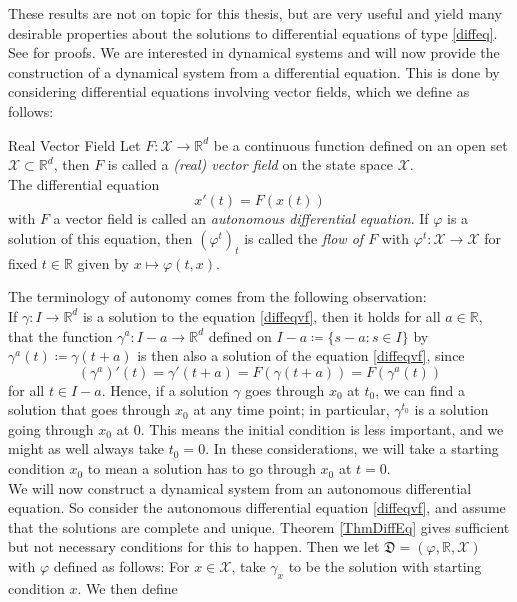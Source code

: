 \documentclass[11pt, a4paper]{memoir}
\theoremstyle{break}
\theoremstyle{break}
\theoremstyle{nonumberplain}
\newcommand{\mR}{\mathbb{R}}
\begin{document}
These results are not on topic for this thesis, but are very useful and yield many desirable properties about the solutions to differential equations of type \ref{diffeq}. See \cite{Dynamics} for proofs. We are interested in dynamical systems and will now provide the construction of a dynamical system from a differential equation. This is done by considering differential equations involving vector fields, which we define as follows:
\begin{mydefinition}{Real Vector Field}
Let $F:\mathcal{X}\to\mR^d$ be a continuous function defined on an open set $\mathcal{X}\subset \mR^d$, then $F$ is called a \emph{(real) vector field} on the state space $\mathcal{X}$.\\[5pt]
The differential equation
\begin{equation}\label{diffeqvf}
x'(t)=F(x(t))
\end{equation}
with $F$ a vector field is called an \emph{autonomous differential equation}. If $\varphi$ is a solution of this equation, then $(\varphi^t)_t$ is called the \emph{flow of $F$} with $\varphi^t: \mathcal{X}\to \mathcal{X}$ for fixed $t\in \mR$ given by $x\mapsto\varphi(t,x)$.
\end{mydefinition}
\noindent The terminology of autonomy comes from the following observation:\\
If $\gamma:I\to\mR^d$ is a solution to the equation \ref{diffeqvf}, then it holds for all $a\in\mR$, that the function $\gamma^a:I-a\to\mR^d$ defined on $I-a\coloneqq \{s-a: s\in I\}$ by $\gamma^a(t)\coloneqq \gamma(t+a)$ is then also a solution of the equation \ref{diffeqvf}, since
$$\left(\gamma^a\right)'(t)=\gamma '(t+a)=F(\gamma(t+a))=F(\gamma^a(t))$$
for all $t\in I-a$. Hence, if a solution $\gamma$ goes through $x_0$ at $t_0$, we can find a solution that goes through $x_0$ at any time point; in particular, $\gamma^{t_0}$ is a solution going through $x_0$ at $0$. This means the initial condition is less important, and we might as well always take $t_0=0$. In these considerations, we will take a starting condition $x_0$ to mean a solution has to go through $x_0$ at $t=0$.\\[5pt]
We will now construct a dynamical system from an autonomous differential equation. So consider the autonomous differential equation \ref{diffeqvf}, and assume that the solutions are complete and unique. Theorem \ref{ThmDiffEq} gives sufficient but not necessary conditions for this to happen. Then we let $\mathfrak{D}=(\varphi,\mR,\mathcal{X})$ with $\varphi$ defined as follows: For $x\in \mathcal{X}$, take $\gamma_x$ to be the solution with starting condition $x$. We then define
\end{document}
